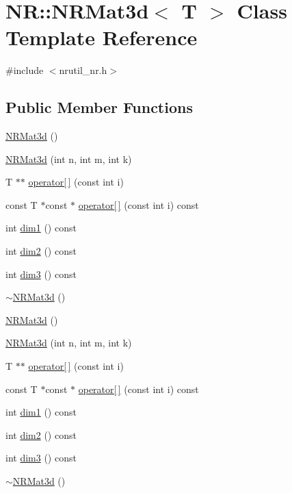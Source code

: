 \hypertarget{classNR_1_1NRMat3d}{}\section{NR\+:\+:N\+R\+Mat3d$<$ T $>$ Class Template Reference}
\label{classNR_1_1NRMat3d}


{\ttfamily \#include $<$nrutil\+\_\+nr.\+h$>$}

\subsection*{Public Member Functions}
\begin{DoxyCompactItemize}
\item 
\mbox{\hyperlink{classNR_1_1NRMat3d_a92498ec487349e85209cfad66e6b7d4e}{N\+R\+Mat3d}} ()
\item 
\mbox{\hyperlink{classNR_1_1NRMat3d_a72437875f6affe5898dee887c3ebfe4c}{N\+R\+Mat3d}} (int n, int m, int k)
\item 
T $\ast$$\ast$ \mbox{\hyperlink{classNR_1_1NRMat3d_a2a302c22836b7c9872fb837f7c6a64c1}{operator\mbox{[}$\,$\mbox{]}}} (const int i)
\item 
const T $\ast$const  $\ast$ \mbox{\hyperlink{classNR_1_1NRMat3d_a93f8b186294e7a585b46a1bf3c5028cc}{operator\mbox{[}$\,$\mbox{]}}} (const int i) const
\item 
int \mbox{\hyperlink{classNR_1_1NRMat3d_ae46651c069e6954e03e5d3a39ffd2891}{dim1}} () const
\item 
int \mbox{\hyperlink{classNR_1_1NRMat3d_a8c287b30748a7fdfc3f4424e26f88252}{dim2}} () const
\item 
int \mbox{\hyperlink{classNR_1_1NRMat3d_aec8af45aa2025ea53f2967a79d0fe233}{dim3}} () const
\item 
\mbox{\hyperlink{classNR_1_1NRMat3d_a6c8dc36e24e162855f99ccfbc380ff52}{$\sim$\+N\+R\+Mat3d}} ()
\item 
\mbox{\hyperlink{classNR_1_1NRMat3d_a92498ec487349e85209cfad66e6b7d4e}{N\+R\+Mat3d}} ()
\item 
\mbox{\hyperlink{classNR_1_1NRMat3d_a72437875f6affe5898dee887c3ebfe4c}{N\+R\+Mat3d}} (int n, int m, int k)
\item 
T $\ast$$\ast$ \mbox{\hyperlink{classNR_1_1NRMat3d_a24920cbac3d063139022a4aafee24e4a}{operator\mbox{[}$\,$\mbox{]}}} (const int i)
\item 
const T $\ast$const  $\ast$ \mbox{\hyperlink{classNR_1_1NRMat3d_a17f8d263fbe8876a2219cc1a4bdac0ca}{operator\mbox{[}$\,$\mbox{]}}} (const int i) const
\item 
int \mbox{\hyperlink{classNR_1_1NRMat3d_ae46651c069e6954e03e5d3a39ffd2891}{dim1}} () const
\item 
int \mbox{\hyperlink{classNR_1_1NRMat3d_a8c287b30748a7fdfc3f4424e26f88252}{dim2}} () const
\item 
int \mbox{\hyperlink{classNR_1_1NRMat3d_aec8af45aa2025ea53f2967a79d0fe233}{dim3}} () const
\item 
\mbox{\hyperlink{classNR_1_1NRMat3d_a6c8dc36e24e162855f99ccfbc380ff52}{$\sim$\+N\+R\+Mat3d}} ()
\end{DoxyCompactItemize}


